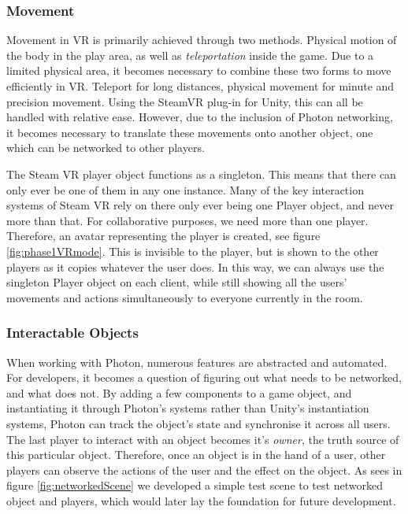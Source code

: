 \subsubsection{Movement}
Movement in VR is primarily achieved through two methods. Physical motion of the body in the play area, as well as \textit{teleportation} inside the game. Due to a limited physical area, it becomes necessary to combine these two forms to move efficiently in VR. Teleport for long distances, physical movement for minute and precision movement. Using the SteamVR plug-in for Unity\cite{steamVRAPI}, this can all be handled with relative ease. However, due to the inclusion of Photon networking, it becomes necessary to translate these movements onto another object, one which can be networked to other players. 

The Steam VR player object functions as a singleton. This means that there can only ever be one of them in any one instance. Many of the key interaction systems of Steam VR rely on there only ever being one Player object, and never more than that. For collaborative purposes, we need more than one player. Therefore, an avatar representing the player is created, see figure \ref{fig:phase1VRmode}. This is invisible to the player, but is shown to the other players as it copies whatever the user does. In this way, we can always use the singleton Player object on each client, while still showing all the users' movements and actions simultaneously to everyone currently in the room. 

\subsubsection{Interactable Objects}
When working with Photon, numerous features are abstracted and automated. For developers, it becomes a question of figuring out what needs to be networked, and what does not. By adding a few components to a game object, and instantiating it through Photon's systems rather than Unity's instantiation systems, Photon can track the object's state and synchronise it across all users. The last player to interact with an object becomes it's \textit{owner}, the truth source of this particular object. Therefore, once an object is in the hand of a user, other players can observe the actions of the user and the effect on the object. As sees in figure \ref{fig:networkedScene} we developed a simple test scene to test networked object and players, which would later lay the foundation for future development.


